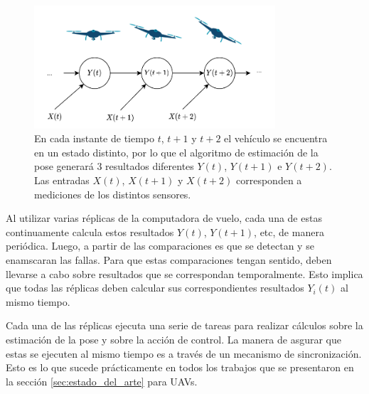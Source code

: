 
\begin{figure}[htb]
    \centering
    \includegraphics[width=0.8\textwidth]{img/evolucion_estados_real_time.png}
    \caption{En cada instante de tiempo $t$, $t+1$ y $t+2$ el vehículo se encuentra en un estado distinto, por lo que el algoritmo de estimación de la pose generará 3 resultados diferentes $Y(t)$, $Y(t+1)$ e $Y(t+2)$. Las entradas $X(t)$, $X(t+1)$ y $X(t+2)$ corresponden a mediciones de los distintos sensores.}
    \label{fig:evolucion_estados_real_time}
\end{figure}

Al utilizar varias réplicas de la computadora de vuelo, cada una de estas continuamente calcula estos resultados $Y(t)$, $Y(t+1)$, etc, de manera periódica. Luego, a partir de las comparaciones es que se detectan y se enamscaran las fallas. Para que estas comparaciones tengan sentido, deben llevarse a cabo sobre resultados que se correspondan temporalmente. Esto implica que todas las réplicas deben calcular sus correspondientes resultados $Y_i(t)$ al mismo tiempo.

Cada una de las réplicas ejecuta una serie de tareas para realizar cálculos sobre la estimación de la pose y sobre la acción de control. La manera de asgurar que estas se ejecuten al mismo tiempo es a través de un mecanismo de sincronización. Esto es lo que sucede prácticamente en todos los trabajos que se presentaron en la sección \ref{sec:estado_del_arte} para UAVs.

